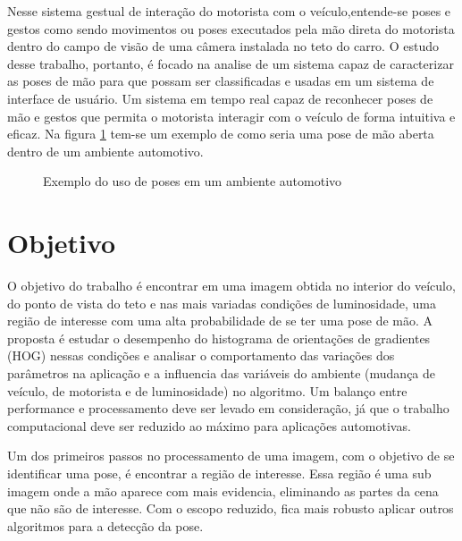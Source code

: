 Nesse sistema gestual de interação do motorista com o veículo,entende-se poses e gestos como sendo movimentos ou poses executados pela mão direta do motorista dentro do campo de visão de uma câmera instalada no teto do carro.
O estudo desse trabalho, portanto, é focado na analise de um sistema capaz de caracterizar as poses de mão para que possam ser classificadas e usadas em um sistema de interface de usuário. Um sistema em tempo real capaz de reconhecer poses de mão e gestos que permita o motorista interagir com o veículo de forma intuitiva e eficaz. Na figura \ref{fig:visao_aplicacao} tem-se um exemplo de como seria uma pose de mão aberta dentro de um ambiente automotivo.

\begin{figure}[ht!]
\centering
{}
  \caption{Exemplo do uso de poses em um ambiente automotivo}
  \label{fig:visao_aplicacao}
\end{figure}

\section{Objetivo}

O objetivo do trabalho é encontrar em uma imagem obtida no interior do veículo, do ponto de vista do teto e nas mais variadas condições de luminosidade, uma região de interesse com uma alta probabilidade de se ter uma pose de mão. A proposta é estudar o desempenho do histograma de orientações de gradientes (HOG) nessas condições e analisar o comportamento das variações dos parâmetros na aplicação e a influencia das variáveis do ambiente (mudança de veículo, de motorista e de luminosidade) no algoritmo.
Um balanço entre performance e processamento deve ser levado em consideração, já que o trabalho computacional deve ser reduzido ao máximo para aplicações automotivas.

Um dos primeiros passos no processamento de uma imagem, com o objetivo de se identificar uma pose, é encontrar a região de interesse. Essa região é uma sub imagem onde a mão aparece com mais evidencia, eliminando as partes da cena que não são de interesse. Com o escopo reduzido, fica mais robusto aplicar outros algoritmos para a detecção da pose.

